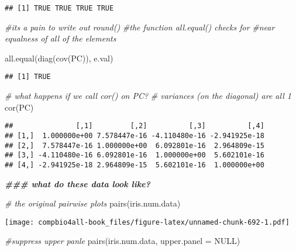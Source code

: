 \documentclass[
]{book}
\newenvironment{Shaded}{\begin{snugshade}}{\end{snugshade}}
\newcommand{\AttributeTok}[1]{\textcolor[rgb]{0.77,0.63,0.00}{#1}}
\newcommand{\CommentTok}[1]{\textcolor[rgb]{0.56,0.35,0.01}{\textit{#1}}}
\newcommand{\ConstantTok}[1]{\textcolor[rgb]{0.00,0.00,0.00}{#1}}
\newcommand{\DocumentationTok}[1]{\textcolor[rgb]{0.56,0.35,0.01}{\textbf{\textit{#1}}}}
\newcommand{\FunctionTok}[1]{\textcolor[rgb]{0.00,0.00,0.00}{#1}}
\newcommand{\NormalTok}[1]{#1}
\begin{document}
\begin{verbatim}
## [1] TRUE TRUE TRUE TRUE
\end{verbatim}

\begin{Shaded}
\begin{Highlighting}[]
\CommentTok{\#its a pain to write out round()}
\CommentTok{\#the function all.equal() checks for }
\CommentTok{\#near equalness of all of the elements}

\FunctionTok{all.equal}\NormalTok{(}\FunctionTok{diag}\NormalTok{(}\FunctionTok{cov}\NormalTok{(PC)), e.val)}
\end{Highlighting}
\end{Shaded}

\begin{verbatim}
## [1] TRUE
\end{verbatim}

\begin{Shaded}
\begin{Highlighting}[]
\CommentTok{\# what happens if we call cor() on PC?}
\CommentTok{\# variances (on the diagonal) are all 1}
\FunctionTok{cor}\NormalTok{(PC)}
\end{Highlighting}
\end{Shaded}

\begin{verbatim}
##               [,1]         [,2]          [,3]          [,4]
## [1,]  1.000000e+00 7.578447e-16 -4.110480e-16 -2.941925e-18
## [2,]  7.578447e-16 1.000000e+00  6.092801e-16  2.964809e-15
## [3,] -4.110480e-16 6.092801e-16  1.000000e+00  5.602101e-16
## [4,] -2.941925e-18 2.964809e-15  5.602101e-16  1.000000e+00
\end{verbatim}

\begin{Shaded}
\begin{Highlighting}[]
\DocumentationTok{\#\#\# what do these data look like? }

\CommentTok{\# the original pairwise plots}
\FunctionTok{pairs}\NormalTok{(iris.num.data)}
\end{Highlighting}
\end{Shaded}

\texttt{[image: compbio4all-book\_files/figure-latex/unnamed-chunk-692-1.pdf]}

\begin{Shaded}
\begin{Highlighting}[]
\CommentTok{\#suppress upper panle}
\FunctionTok{pairs}\NormalTok{(iris.num.data, }\AttributeTok{upper.panel =} \ConstantTok{NULL}\NormalTok{)}
\end{Highlighting}
\end{Shaded}
\end{document}

